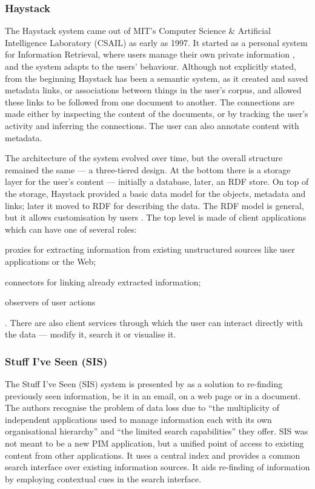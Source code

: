 \subsubsection{Haystack}

The Haystack system came out of MIT's Computer Science \& Artificial Intelligence Laboratory (CSAIL) as early as 1997. It started as a personal system for Information Retrieval, where users manage their own private information \cite{Adar1999}, and the system adapts to the users' behaviour. Although not explicitly stated, from the beginning Haystack has been a semantic system, as it created and saved metadata links, or associations between things in the user's corpus, and allowed these links to be followed from one document to another. The connections are made either by inspecting the content of the documents, or by tracking the user's activity and inferring the connections. The user can also annotate content with metadata. 

The architecture of the system evolved over time, but the overall structure remained the same \cite{Huynh2002,Quan2003b} --- a three-tiered design. At the bottom there is a storage layer for the user's content --- initially a database, later, an RDF store. On top of the storage, Haystack provided a basic data model for the objects, metadata and links; later it moved to RDF for describing the data. The RDF model is general, but it allows customisation by users \cite{Karger2006}. The top level is made of client applications which can have one of several roles: \begin{inparaenum}[(i)] \item proxies for extracting information from existing unstructured sources like user applications or the Web; \item connectors for linking already extracted information; \item observers of user actions \end{inparaenum}. There are also client services through which the user can interact directly with the data --- modify it, search it or visualise it. 

\subsubsection{Stuff I've Seen (SIS)}

The Stuff I've Seen (SIS) system is presented by \cite{Dumais2003} as a solution to re-finding previously seen information, be it in an email, on a web page or in a document. The authors recognise the problem of data loss due to ``the multiplicity of independent applications used to manage information each with its own organisational hierarchy'' and ``the limited search capabilities'' they offer. SIS was not meant to be a new PIM application, but a unified point of access to existing content from other applications. It uses a central index and provides a common search interface over existing information sources. It aids re-finding of information by employing contextual cues in the search interface. 

